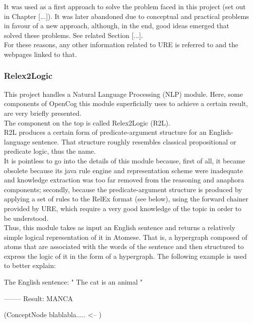 It was used as a first approach to solve the problem faced in this project (set out in Chapter [...]). It was later abandoned due to conceptual and practical problems in favour of a new approach, although, in the end, good ideas emerged that solved these problems. See related Section [...]. \\
For these reasons, any other information related to URE is referred to \cite{geisweiller_2019} and the webpages linked to that.

\subsubsection{Relex2Logic}\label{sec:r2l}

This project handles a Natural Language Processing (NLP) module. Here, some components of OpenCog this module superficially uses to achieve a certain result, are very briefly presented. \\
The component on the top is called Relex2Logic (R2L). \\
R2L produces a certain form of predicate-argument structure for an English-language sentence. That structure roughly resembles classical propositional or predicate logic, thus the name. \\
It is pointless to go into the details of this module because, first of all, it became obsolete because its java rule engine and representation scheme were inadequate and knowledge extraction was too far removed from the reasoning and anaphora components; secondly, because the predicate-argument structure is produced by applying a set of rules to the RelEx format (see below), using the forward chainer provided by URE, which require a very good knowledge of the topic in order to be understood. \\

Thus, this module takes as input an English sentence and returns a relatively simple logical representation of it in Atomese. That is, a hypergraph composed of atoms that are associated with the words of the sentence and then structured to express the logic of it in the form of a hypergraph. The following example is used to better explain: \\
\begin{python}
	The English sentence: " The cat is an animal "

	-------- Result:
	MANCA 

	(ConceptNode blablabla.....	<--
	)
\end{python}

